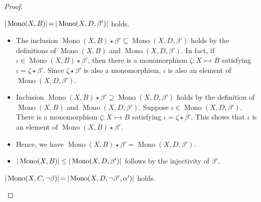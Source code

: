 \begin{proof}
    \label{subgraph_counting:proof:dcomp_w_u}
\begin{claim}
    $|\operatorname{Mono}(X, B)| \mathop{=} |\operatorname{Mono}(X, D, \beta')|$ holds.
\end{claim}
\begin{itemize} 
    \item The inclusion \(\operatorname{Mono}(X, B) \mathop{\star} \beta' \mathop{\subseteq} \operatorname{Mono}(X, D, \beta')\) holds by the definitions of $\operatorname{Mono}(X, B)$ and $\operatorname{Mono}(X, D, \beta')$. 
    In fact, if \(\iota  \mathop{\in} \operatorname{Mono}(X, B) \mathop{\star} \beta' \), then there is a monomorphism \(\zeta : X \rightarrowtail B\) satisfying \(\iota \mathop{=} \zeta \mathop{\star} \beta'\). Since $\zeta \mathop{\star} \beta'$ is also a monomorphism, \(\iota\) is also an element of \(\operatorname{Mono}(X, D, \beta')\).
    \item Inclusion \(\operatorname{Mono}(X, B) \mathop{\star} \beta' \supseteq \operatorname{Mono}(X, D, \beta')\) holds by the definition of $\operatorname{Mono}(X, B)$ and $\operatorname{Mono}(X, D, \beta')$.
    Suppose \(\iota \mathop{\in} \operatorname{Mono}(X, D, \beta')\). There is a monomorphism \(\zeta : X \rightarrowtail B\) satisfying \(\iota \mathop{=} \zeta \mathop{\star} \beta'\). This shows that \(\iota \) is an element of \(\operatorname{Mono}(X, B) \mathop{\star} \beta'\).
    \item Hence, we have \(\operatorname{Mono}(X, B) \mathop{\star} \beta' \mathop{=} \operatorname{Mono}(X, D, \beta')\).
    \item $|\operatorname{Mono}(X, B)| \leq |\operatorname{Mono}(X, D, \beta')|$ follows by the injectivity of $\beta'$.
\end{itemize}
\begin{claim}
     $|\operatorname{Mono}(X, C, \lnot \beta)| \mathop{=} |\operatorname{Mono}(X, D, \lnot \beta', \alpha')|$ holds.
   \end{claim}
    \begin{itemize}

\end{itemize}
\end{proof}
